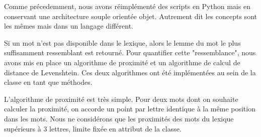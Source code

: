 \documentclass{article}
\begin{document}
Comme précedemment, nous avons réimplémenté des scripts en Python mais en conservant une architecture souple orientée objet. Autrement dit les concepts sont les mêmes mais dans un langage différent.

Si un mot n'est pas disponible dans le lexique, alors le lemme du mot le plus suffisamment ressemblant est retourné. Pour quantifier cette "ressemblance", nous avons mis en place un algorithme de proximité et un algorithme de calcul de distance de Levenshtein. Ces deux algorithmes ont été implémentées au sein de la classe en tant que méthodes.

L'algorithme de proximité est très simple. Pour deux mots dont on souhaite calculer la proximité, on accorde un point par lettre identique à la même position dans les mots. Nous ne considérons que les proximités des mots du lexique supérieurs à 3 lettres, limite fixée en attribut de la classe.

\end{document}

